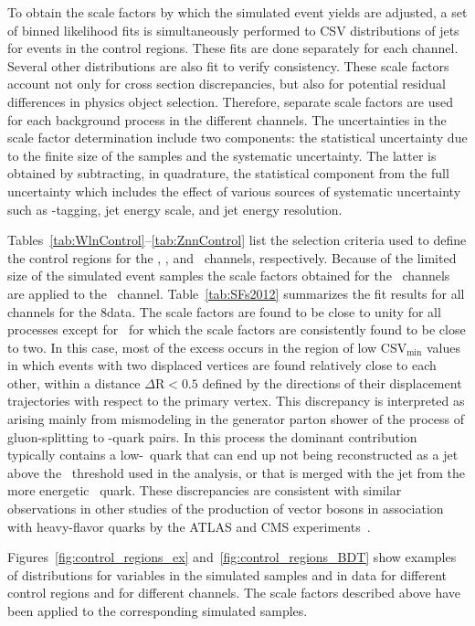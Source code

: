 \documentclass[12pt,twoside,a4paper,cmspaper,final,collab]{cms-tdr}
\begin{document}
To obtain the scale factors by which the simulated event
yields are adjusted, a set of binned likelihood fits is simultaneously performed to CSV distributions of
jets for events in the control regions. These fits are done separately
for each channel. Several other distributions are also fit to
verify consistency. These scale factors
account not only for cross section discrepancies, but also for potential residual
differences in physics object selection.
Therefore, separate scale factors are used for each background
process in the different channels. The uncertainties in the scale factor determination include two components: the statistical uncertainty due to the finite size of the samples and the systematic uncertainty.
The latter is obtained by subtracting, in quadrature, the statistical component from the full uncertainty which includes the effect of various sources of systematic uncertainty such as \cPqb-tagging, jet energy scale, and jet energy resolution.

Tables~\ref{tab:WlnControl}--\ref{tab:ZnnControl} list the selection criteria
used to define the control regions for the \WlnH, \ZllH, and \ZnnH\ channels,
respectively.  Because of the limited size of the simulated event
samples the scale factors obtained for the \WlnH\ channels are applied to the \WtnH\ channel.
Table~\ref{tab:SFs2012} summarizes the fit results
for all channels for the 8\TeV data. The scale factors are found to be
close to unity for all processes except for \Voneb\, for which the scale factors are consistently
found to be close to two. In this case, most of the excess occurs in
the region of low CSV$_{\text{min}}$ values in which events with two displaced vertices are found relatively close to each
other, within a distance $\Delta{\mathrm R}<0.5$ defined by the
directions of their displacement trajectories with respect to the
primary vertex. This discrepancy
is interpreted as arising mainly from mismodeling in the generator
parton shower of the process of gluon-splitting to \cPqb-quark pairs. In this
process the dominant contribution typically contains a low-\pt \cPqb\ quark that can end up not being reconstructed
as a jet above the \pt\ threshold used in the analysis, or that is merged with the jet from the more energetic \cPqb\ quark. These
discrepancies are consistent with similar observations in other
studies of the production of vector
bosons in association with heavy-flavor quarks by the
ATLAS and CMS experiments~\cite{Aad:2013vka,Chatrchyan:2013zja,Chatrchyan:2012vr}.

Figures~\ref{fig:control_regions_ex} and~\ref{fig:control_regions_BDT} show examples of distributions for variables in the simulated
      samples and in data for different
      control regions and for different channels. The scale factors
      described above have been applied to the corresponding simulated samples.
\end{document}
